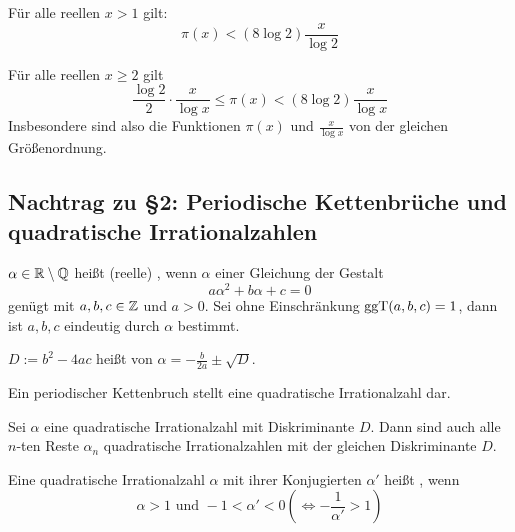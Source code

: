 \begin{falko} \label{F8.14}
	Für alle reellen $x > 1$ gilt:
	\begin{equation}
		\pi(x) < (8 \log 2) \frac{x}{\log 2} \label{eq_F8.14}
	\end{equation}
\end{falko}

\begin{satz} \label{satz_8.3}
	Für alle reellen $x \geq 2$ gilt
	\begin{equation}
		\frac{\log 2}{2} \cdot \frac{x}{\log x} \leq \pi(x) < (8 \log 2) \frac{x}{\log x} \label{eq_satz_8.3}
	\end{equation}
	Insbesondere sind also die Funktionen $\pi(x)$ und $\frac{x}{\log x}$ von der gleichen Größenordnung.
\end{satz}

\subsection{Nachtrag zu §2: Periodische Kettenbrüche und quadratische Irrationalzahlen}
	$\alpha \in \mathbb{R} \setminus \mathbb{Q}$ heißt (reelle) , wenn $\alpha$ einer Gleichung der Gestalt
	\begin{equation}
		a \alpha^2 + b \alpha + c = 0 \label{eq_quad_gl}
	\end{equation}
	genügt mit $a,b,c \in \mathbb{Z}$ und $a > 0$. Sei ohne Einschränkung $\operatorname{ggT}(a,b,c) = 1$, dann ist $a,b,c$ eindeutig durch $\alpha$ bestimmt.
	
	$D:= b^2 - 4ac$ heißt  von $\alpha = -\frac{b}{2a} \pm \sqrt{D}$.
	
\begin{falko} \label{F8.1_2}
	Ein periodischer Kettenbruch stellt eine quadratische Irrationalzahl dar. 
\end{falko}

\begin{lemma} \label{lemma_8.1}
	Sei $\alpha$ eine quadratische Irrationalzahl mit Diskriminante $D$. Dann sind auch alle $n$-ten Reste $\alpha_n$ quadratische Irrationalzahlen mit der gleichen Diskriminante $D$.
\end{lemma}

\begin{defn}[reduziert] 
	Eine quadratische Irrationalzahl $\alpha$ mit ihrer Konjugierten $\alpha'$ heißt , wenn
	\begin{equation}
		\alpha > 1 \text{ und } -1 < \alpha' < 0 (\Leftrightarrow -\frac{1}{\alpha'}>1) \label{eq_R}
	\end{equation}
\end{defn}

